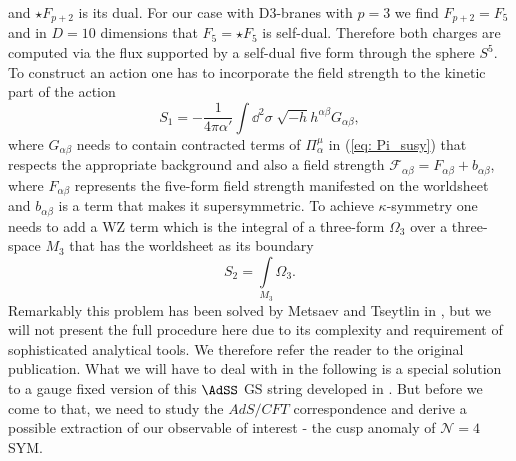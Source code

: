 %
%
and $\star F_{p+2}$ is its  dual. For our case with D3-branes with $p=3$ we find $F_{p+2}=F_{5}$ and in $D=10$ dimensions that $F_{5}=\star F_{5}$ is self-dual. Therefore both charges are computed via the flux supported by a self-dual five form through the sphere $S^{5}$. To construct an action one has to incorporate the field strength to the kinetic part of the action 
%
%
\begin{equation}
S_{1} = -\frac{1}{4\pi \alpha'} \int \dd^{2}\sigma\; \sqrt{-h}h^{\alpha\beta} G_{\alpha\beta},
\end{equation}
%
%
where $G_{\alpha\beta}$ needs to contain contracted terms of $\Pi^{\mu}_{\alpha}$ in (\ref{eq: Pi_susy}) that respects the appropriate background and also a field strength $\mathcal{F}_{\alpha\beta} = F_{\alpha\beta}+b_{\alpha\beta}$, where $F_{\alpha\beta}$ represents the five-form field strength manifested on the worldsheet and $b_{\alpha\beta}$ is a term that makes it supersymmetric. To achieve $\kappa$-symmetry one needs to add a WZ term which is the integral of a three-form $\Omega_{3}$ over a three-space $M_{3}$ that has the worldsheet as its boundary
%
%
\begin{equation}
S_{2} = \int\limits_{M_{3}} \Omega_{3}.
\end{equation}
%
%
Remarkably this problem has been solved by Metsaev and Tseytlin in \cite{Metsaev:1998it}, but we will not present the full procedure here due to its complexity and requirement of sophisticated analytical tools. We therefore refer the reader to the original publication. What we will have to deal with in the following is a special solution to a gauge fixed version of this $\AdSS$ GS string developed in \cite{Metsaev:1998it}. But before we come to that, we need to study the $AdS/CFT$ correspondence and derive a possible extraction of our observable of interest - the cusp anomaly of $\mathcal{N}=4$ SYM. 
